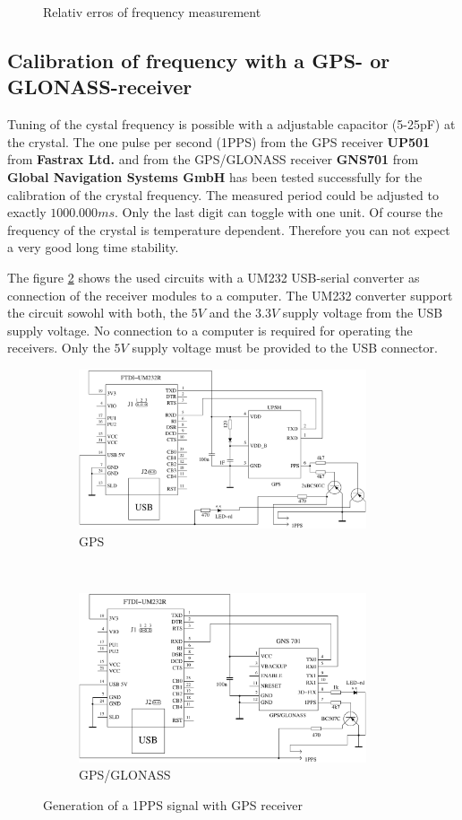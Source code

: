 \begin{figure}[H]
\centering

\caption{Relativ erros of frequency measurement}
\label{fig:freq-ppm}
\end{figure}

\subsection{Calibration of frequency with a GPS- or GLONASS-receiver}

Tuning of the cystal frequency is possible with a adjustable capacitor (5-25pF) at the crystal.
The one pulse per second (1PPS) from the GPS receiver {\bf UP501} from {\bf Fastrax Ltd.} and from the GPS/GLONASS receiver
{\bf GNS701} from {\bf Global Navigation Systems GmbH} has been tested successfully for the calibration of the
crystal frequency.
The measured period could be adjusted to exactly \(1000.000ms\).
Only the last digit can toggle with one unit.
Of course the frequency of the crystal is temperature dependent.
Therefore you can not expect a very good long time stability.

The figure \ref{fig:GPS-1PPS} shows the used circuits with a UM232 USB-serial converter
as connection of the receiver modules to a computer.
The UM232 converter support the circuit sowohl with both, the \(5V\) and the \(3.3V\) supply voltage
from the USB supply voltage.
No connection to a computer is required for operating the receivers.
Only the \(5V\) supply voltage must be provided to the USB connector.

\begin{figure}[H]
  \begin{subfigure}[b]{9cm}
    \centering
    \includegraphics[width=8.5cm]{../FIG/GPS_UP501.pdf}
    \caption{GPS}
  \end{subfigure}
  ~
  \begin{subfigure}[b]{9cm}
    \centering
    \includegraphics[width=8.5cm]{../FIG/GPS_GNS701.pdf}
    \caption{GPS/GLONASS}
  \end{subfigure}
  \caption{Generation of a 1PPS signal with GPS receiver }
  \label{fig:GPS-1PPS}
\end{figure}

